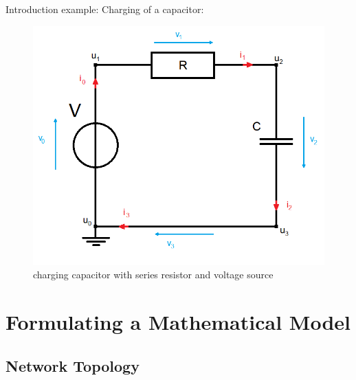 






	\begin{frame}
		Introduction example: Charging of a capacitor:\\
		\begin{figure}[H]
			\centering
			\includegraphics[scale=0.4]{../Tex/pictures/Example1_simple.png}
			\caption{charging capacitor with series resistor and voltage source}
			\label{circuit:charging of capacitor}
		\end{figure}
	\end{frame}

\section*{Formulating a Mathematical Model}

	\subsection{Network Topology}
		

